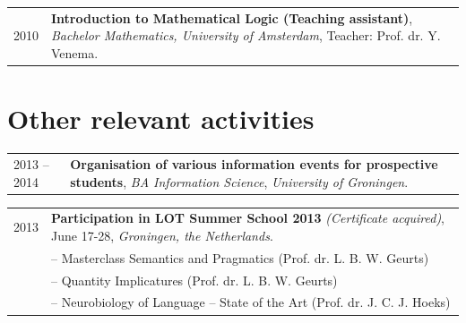 \documentclass[a4paper,10pt]{article}
\def\leftcolwidth{.12\textwidth}
\def\tablevspace{10pt}
\begin{document}
\vspace{\tablevspace}

\noindent
\begin{tabularx}{\textwidth}{ p{\leftcolwidth} X }
  2010
  & \textbf{Introduction to Mathematical Logic (Teaching assistant)},
    \textit{Bachelor Mathematics, University of Amsterdam},
    Teacher: Prof. dr. Y. Venema.\\
\end{tabularx}


\section*{Other relevant activities}


\vspace{\tablevspace}

\noindent
\begin{tabularx}{\textwidth}{ p{\leftcolwidth} X }
  2013 -- 2014
  & \textbf{Organisation of various information events for prospective students}, 
  \textit{BA Information Science}, \textit{University of Groningen}.\\
\end{tabularx}

\vspace{\tablevspace}

\noindent
\begin{tabularx}{\textwidth}{ p{\leftcolwidth} X }
  2013 & \textbf{Participation in LOT Summer School 2013} \textit{(Certificate acquired)}, June 17-28,
         \textit{Groningen, the Netherlands}.\\
       & -- {Masterclass Semantics and Pragmatics} (Prof. dr. L. B. W. Geurts)\\
       & -- {Quantity Implicatures} (Prof. dr. L. B. W. Geurts)\\
       & -- {Neurobiology of Language -- State of the Art} (Prof. dr. J. C. J. Hoeks)\\
\end{tabularx}
\end{document}
